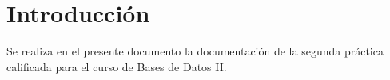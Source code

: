 \vspace*{\fill}

\section{Introducción}

  Se realiza en el presente documento la documentación de la segunda práctica calificada para el curso de Bases de Datos II.

\vspace*{\fill}
